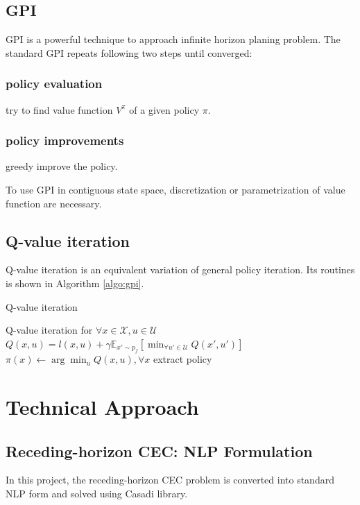 \documentclass[conference]{IEEEtran}
\begin{document}
\subsection{GPI}
GPI is a powerful technique to approach 
infinite horizon planing problem.
The standard GPI repeats following two steps until converged:
\subsubsection{policy evaluation} try to find value function $V^{\pi}$ of a given policy $\pi$.
\subsubsection{policy improvements} greedy improve the policy.

To use GPI in contiguous state space, 
discretization or parametrization of value function are necessary.

\subsection{Q-value iteration}
Q-value iteration is an equivalent variation of general policy iteration.
Its routines is shown in Algorithm \ref{algo:gpi}.
\begin{algorithm}
    \caption{Q-value iteration}
    \label{algo:gpi}
    \begin{algorithmic}[1] %
        \Comment Q-value iteration
        \State for $\forall x \in \mathcal{X}, u \in \mathcal{U}$
        \State $Q(x,u) = l(x,u) + \gamma \mathbb{E}_{x'\sim p_f}\left[\min_{\forall u' \in \mathcal{U}} Q(x', u')\right]$
    \EndWhile
    \State $\pi(x) \leftarrow \arg\min_u Q(x, u), \forall x$
    \Comment extract policy
    \end{algorithmic}
\end{algorithm}


\section{Technical Approach}

\subsection{Receding-horizon CEC: NLP Formulation}
In this project, the receding-horizon CEC problem is converted into standard NLP form and solved using Casadi library.
\end{document}
